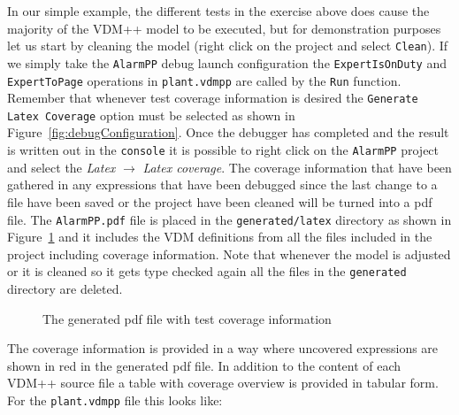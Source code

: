 In our simple example, the different tests in the exercise above does
cause the majority of the VDM++ model to be executed, but for
demonstration purposes let us start by cleaning the model (right click
on the project and select \texttt{Clean}). If we simply take the
\texttt{AlarmPP} debug launch configuration the
\verb|ExpertIsOnDuty| and \verb|ExpertToPage| operations in 
\verb|plant.vdmpp| are called by the
\texttt{Run} function. Remember that whenever test coverage
information is desired the \texttt{Generate Latex Coverage} option
must be selected as shown in Figure~\ref{fig:debugConfiguration}. 
Once the debugger has completed and the result
is written out in the \texttt{console} it is possible to right click
on the \texttt{AlarmPP} project and select the \emph{Latex} $
\rightarrow $ \emph{Latex coverage}. The coverage information that have
been gathered in any expressions that have been debugged since the
last change to a file have been saved or the project have been cleaned
will be turned into a pdf file. The \texttt{AlarmPP.pdf} file is
placed in the \texttt{generated/latex} directory as shown in
Figure~\ref{fig:testcov} and it includes the
VDM definitions from all the files included in the project including
coverage information. Note that whenever the model is adjusted or it
is cleaned so it gets type checked again all the files in the
\texttt{generated} directory are deleted.

\begin{figure}[tb]
\begin{center}
\end{center}
\caption{The generated pdf file with test coverage information\label{fig:testcov}}
\end{figure}

The coverage information is provided in a way where uncovered
expressions are shown in red in the generated pdf file. In addition
to the content of each VDM++ source file a table with coverage
overview is provided in tabular form. For the \texttt{plant.vdmpp}
file this looks like:

